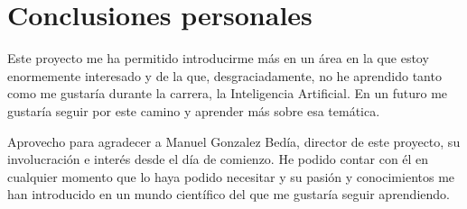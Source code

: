 \chapter{Conclusiones personales}

Este proyecto me ha permitido introducirme más en un área en la que estoy enormemente interesado y de la que, desgraciadamente, no he aprendido tanto como me gustaría durante la carrera, la Inteligencia Artificial. En un futuro
me gustaría seguir por este camino y aprender más sobre esa temática.

Aprovecho para agradecer a Manuel Gonzalez Bedía, director de este proyecto, su involucración e interés desde el día de comienzo. He podido contar con él en cualquier momento que lo haya podido necesitar y su pasión y conocimientos me han introducido
en un mundo científico del que me gustaría seguir aprendiendo.
